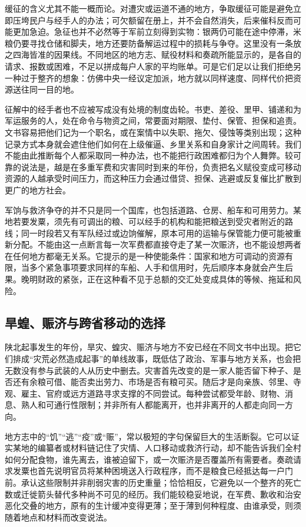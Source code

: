 缓征的含义尤其不能一概而论。对遭灾或运道不通的地方，争取缓征可能是避免立即压垮民户与经手人的办法；可欠额留在册上，并不会自然消失，后来催科反而可能更加急迫。急征也并不必然等于军前立刻得到实物：银两仍可能在途中停滞，米粮仍要寻找仓储和脚夫，地方还要防备解运过程中的损耗与争夺。这里没有一条放之四海皆准的因果线。不同地区的地方志、赋役材料和奏疏所能显示的，是各自的请求、报数或困难，不足以拼成每户人家的平均账单。可是它们足以让我们拒绝另一种过于整齐的想象：仿佛中央一经议定加派，地方就以同样速度、同样代价把资源送往同一目的地。

征解中的经手者也不应被写成没有处境的制度齿轮。书吏、差役、里甲、铺递和为军运服务的人，处在命令与物资之间，常要面对期限、垫付、保管、担保和追责。文书容易把他们记为一个职名，或在案情中以失职、拖欠、侵蚀等类别出现；这种记录方式本身就会遮住他们如何在上级催逼、乡里关系和自身家计之间周转。我们不能由此推断每个人都采取同一种办法，也不能把行政困难都归为个人舞弊。较可靠的说法是，越是在多重军费和灾害同时到来的年份，负责把名义赋役变成可移动资源的人越承受时间压力，而这种压力会通过借贷、担保、逃避或反复催比扩散到更广的地方社会。

军饷与救济争夺的并不只是同一个国库，也包括道路、仓房、船车和可用劳力。某地若要发粟，须先有可调出的粮、可以经手的机构和能把粮送到受灾者附近的路线；同一时段若又有军队经过或边饷催解，原本可用的运输与保管能力便可能被重新分配。不能由这一点断言每一次军费都直接夺走了某一次赈济，也不能设想两者在任何地方都毫无关系。它提示的是一种使能条件：国家和地方可调动的资源有限，当多个紧急事项要求同样的车船、人手和信用时，先后顺序本身就会产生后果。晚明财政的紧张，正在这种看不见于总额的交汇处变成具体的等候、拖延和风险。

\subsection{旱蝗、赈济与跨省移动的选择}

陕北起事发生的年份，旱灾、蝗灾、赈济与地方不安已经在不同文书中出现。把它们排成“灾荒必然造成起事”的单线故事，既低估了政治、军事与地方关系，也会把无数没有参与武装的人从历史中删去。灾害首先改变的是一家人能否留下种子、是否还有余粮可借、能否卖出劳力、市场是否有粮可买。随后才是向亲族、邻里、寺观、雇主、官府或远方道路寻求支撑的不同尝试。每种尝试都受年龄、财物、消息、熟人和可通行性限制；并非所有人都能离开，也并非离开的人都走向同一方向。

地方志中的“饥”“逃”“疫”或“赈”，常以极短的字句保留巨大的生活断裂。它可以证实某地的编纂者或材料链记住了灾情、人口移动或救济行动，却不能告诉我们全村如何分配食物，谁先离去，谁被迫留下，或一次赈济是否覆盖所有需要者。奏疏请求发粟也首先说明官员将某种困境送入行政程序，而不是粮食已经抵达每一户门前。承认这些限制并非削弱灾害的历史重量；恰恰相反，它避免以一个整齐的死亡数或迁徙箭头替代多种尚不可见的经历。我们能较稳妥地说，在军费、歉收和治安恶化交叠的地方，原有的生计缓冲变得更薄；至于薄到何种程度、由谁承受，则须随着地点和材料而改变说法。

